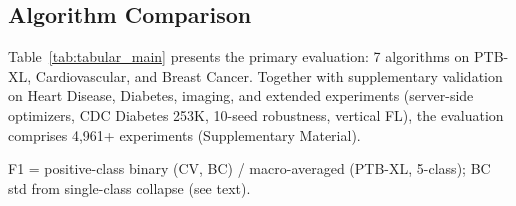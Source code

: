\documentclass[conference]{IEEEtran}
\begin{document}
\subsection{Algorithm Comparison}

Table~\ref{tab:tabular_main} presents the primary evaluation: 7 algorithms on PTB-XL, Cardiovascular, and Breast Cancer. Together with supplementary validation on Heart Disease, Diabetes, imaging, and extended experiments (server-side optimizers, CDC Diabetes 253K, 10-seed robustness, vertical FL), the evaluation comprises 4,961+ experiments (Supplementary Material).

\begin{table}[htbp]
\centering
\caption{FL Algorithm Comparison on Real Clinical Datasets (7 Algorithms $\times$ 3 Datasets). Best accuracy per dataset in \textbf{bold}. Mean $\pm$ std over 5 seeds. PX = PTB-XL ECG (5 clients, 5-class, site-based), CV = Cardiovascular (5 clients, binary, $\alpha$=0.5), BC = Breast Cancer (3 clients, binary, $\alpha$=0.5).}
\label{tab:tabular_main}
\par{\footnotesize F1 = positive-class binary (CV, BC) / macro-averaged (PTB-XL, 5-class); BC std from single-class collapse (see text).}
\end{table}
\end{document}
